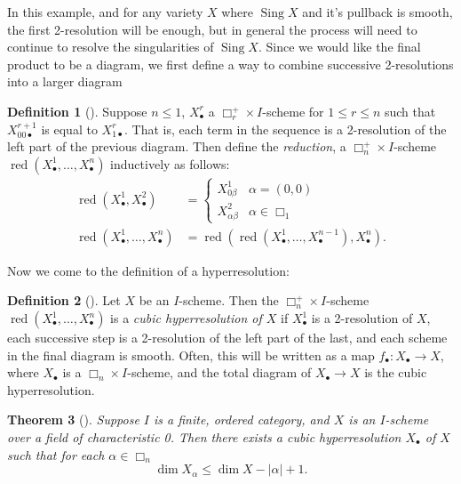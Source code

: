 \documentclass[proquest]{uwthesis}[2014/11/13]
\newtheorem{theorem}{Theorem}[section]
\theoremstyle{definition}
\newtheorem{definition}[theorem]{Definition}
\DeclareMathOperator{\Sing}{Sing}
\DeclareMathOperator{\red}{red}
\begin{document}
In this example, and for any variety $X$ where $\Sing X$ and it's pullback is smooth, the first 2-resolution will be enough, but in general the process will need to continue to resolve the singularities of $\Sing X$.
Since we would like the final product to be a diagram, we first define a way to combine successive 2-resolutions into a larger diagram

\begin{definition}[{\cite[10.78]{Kollar2013}}]
	Suppose $n \leq 1$, $X^r_\bullet$ a $\Box^+_r \times I$-scheme for $1 \leq r \leq n$ such that $X_{00\bullet}^{r+1}$ is equal to $X_{1\bullet}^r$.
	That is, each term in the sequence is a 2-resolution of the left part of the previous diagram.
	Then define the {\it reduction}, a $\Box_n^+ \times I$-scheme $\red(X_\bullet^1, \dots, X_\bullet^n)$ inductively as follows:
	\begin{align*}
		\red(X_\bullet^1, X_\bullet^2) &= 
		\begin{cases}
			X^1_{0\beta} & \alpha = (0,0) \\
			X^2_{\alpha\beta} & \alpha \in \Box_1
		\end{cases} \\
		\red(X_\bullet^1, \dots, X_\bullet^n) &= \red(\red(X_\bullet^1, \dots, X_\bullet^{n-1}), X^n_\bullet).
	\end{align*}
\end{definition}

Now we come to the definition of a hyperresolution:

\begin{definition}[{\cite[10.79]{Kollar2013}}]
	Let $X$ be an $I$-scheme.
	Then the $\Box_n^+ \times I$-scheme $\red(X_\bullet^1, \dots, X_\bullet^n)$ is a {\it cubic hyperresolution of $X$} if $X_\bullet^1$ is a 2-resolution of $X$, each successive step is a 2-resolution of the left part of the last, and each scheme in the final diagram is smooth.
	Often, this will be written as a map $f_\bullet : X_\bullet \rightarrow X$, where $X_\bullet$ is a $\Box_n \times I$-scheme, and the total diagram of $X_\bullet \rightarrow X$ is the cubic hyperresolution.
\end{definition}

\begin{theorem}[{\cite[I 2.15]{Guillen1988}}]
	\label{thm:hyperexist}
	Suppose $I$ is a finite, ordered category, and $X$ is an $I$-scheme over a field of characteristic 0.
	Then there exists a cubic hyperresolution $X_\bullet$ of $X$ such that for each $\alpha \in \Box_n$
	\[
	\dim X_\alpha \leq \dim X - |\alpha| + 1.
	\]
\end{theorem}
\end{document}
